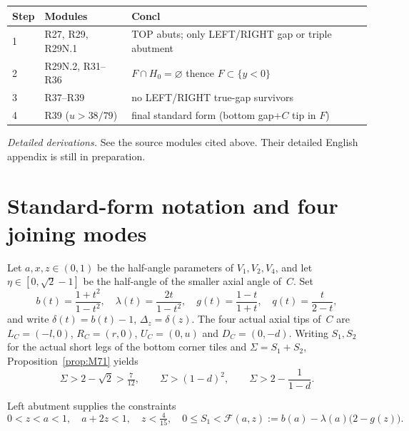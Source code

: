 \documentclass[11pt,reqno]{amsart}
\theoremstyle{definition}
\begin{document}
\begin{center}
\small
\begin{tabular}{@{}p{}p{}p{}@{}}
\toprule
Step & Modules & Concl \\
\midrule
1 & R27, R29, R29N.1 & TOP abuts; only LEFT/RIGHT gap or triple abutment \\
2 & R29N.2, R31--R36 & $F\cap H_0=\varnothing$ thence $F\subset\{y<0\}$ \\
3 & R37--R39 & no LEFT/RIGHT true-gap survivors \\
4 & R39 ($u>38/79$) & final standard form (bottom gap+$C$ tip in $F$) \\
\bottomrule
\end{tabular}
\end{center}
\smallskip
\noindent\emph{Detailed derivations.} See the source modules cited above. Their detailed English appendix is still in preparation.

\section{Standard-form notation and four joining modes}\label{sec:std}

Let $a,x,z\in(0,1)$ be the half-angle parameters of $V_1,V_2,V_4$, and let
$\eta\in[0,\sqrt2-1]$ be the half-angle of the smaller axial angle of~$C$.  Set
\begin{equation}\label{eq:M8}
b(t)=\frac{1+t^2}{1-t^2},\quad
\lambda(t)=\frac{2t}{1-t^2},\quad
g(t)=\frac{1-t}{1+t},\quad
q(t)=\frac{t}{2-t},
\end{equation}
and write $\delta(t)=b(t)-1$, $\Delta_z=\delta(z)$.  The four actual axial tips
of~$C$ are $L_C=(-l,0)$, $R_C=(r,0)$, $U_C=(0,u)$ and $D_C=(0,-d)$.  Writing
$S_1,S_2$ for the actual short legs of the bottom corner tiles and
$\Sigma=S_1+S_2$, Proposition~\ref{prop:M71} yields
\begin{equation}\label{eq:M9}
\Sigma>2-\sqrt2>\tfrac7{12},\qquad
\Sigma>(1-d)^2,\qquad
\Sigma>2-\frac1{1-d}.
\end{equation}


Left abutment supplies the constraints
\begin{equation}\label{eq:M10}
0<z<a<1,\quad a+2z<1,\quad z<\tfrac4{15},\quad
0\le S_1<\mathcal F(a,z):=b(a)-\lambda(a)\bigl(2-g(z)\bigr).
\end{equation}
\end{document}
